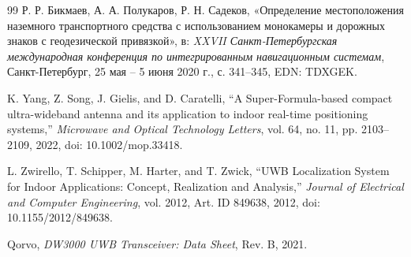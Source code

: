 \documentclass{misisarticle}
\begin{document}
\begin{thebibliography}{99}
Р. Р. Бикмаев, А. А. Полукаров, Р. Н. Садеков,
«Определение местоположения наземного транспортного средства с использованием монокамеры и дорожных знаков с геодезической привязкой»,
в: \textit{XXVII Санкт-Петербургская международная конференция по интегрированным навигационным системам},
Санкт-Петербург, 25 мая -- 5 июня 2020 г., с. 341--345, EDN: TDXGEK.

K. Yang, Z. Song, J. Gielis, and D. Caratelli,
``A Super-Formula-based compact ultra-wideband antenna and its application to indoor real-time positioning systems,''
\textit{Microwave and Optical Technology Letters}, vol. 64, no. 11, pp. 2103--2109, 2022,
doi: 10.1002/mop.33418.

L. Zwirello, T. Schipper, M. Harter, and T. Zwick,
``UWB Localization System for Indoor Applications: Concept, Realization and Analysis,''
\textit{Journal of Electrical and Computer Engineering}, vol. 2012, Art. ID 849638, 2012,
doi: 10.1155/2012/849638.

Qorvo,
\textit{DW3000 UWB Transceiver: Data Sheet}, Rev. B, 2021.

\end{thebibliography}
\end{document}
